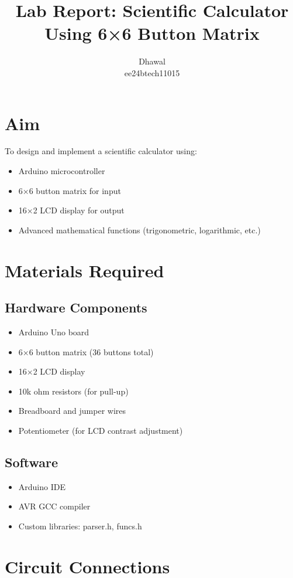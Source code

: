 \documentclass{article}
\title{Lab Report: Scientific Calculator Using 6×6 Button Matrix}
\author{Dhawal\\ ee24btech11015}
\begin{document}
\maketitle

\section{Aim}
To design and implement a scientific calculator using:
\begin{itemize}
    \item Arduino microcontroller
    \item 6×6 button matrix for input
    \item 16×2 LCD display for output
    \item Advanced mathematical functions (trigonometric, logarithmic, etc.)
\end{itemize}

\section{Materials Required}
\subsection{Hardware Components}
\begin{itemize}
    \item Arduino Uno board
    \item 6×6 button matrix (36 buttons total)
    \item 16×2 LCD display
    \item 10k ohm resistors (for pull-up)
    \item Breadboard and jumper wires
    \item Potentiometer (for LCD contrast adjustment)
\end{itemize}

\subsection{Software}
\begin{itemize}
    \item Arduino IDE
    \item AVR GCC compiler
    \item Custom libraries: parser.h, funcs.h
\end{itemize}

\section{Circuit Connections}
\end{document}
